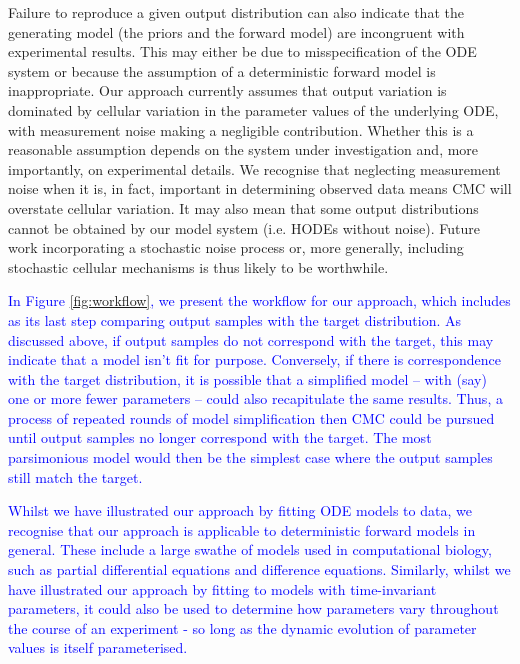 Failure to reproduce a given output distribution can also indicate that the generating model (the priors and the forward model) are incongruent with experimental results. This may either be due to misspecification of the ODE system or because the assumption of a deterministic forward model is inappropriate. Our approach currently assumes that output variation is dominated by cellular variation in the parameter values of the underlying ODE, with measurement noise making a negligible contribution. Whether this is a reasonable assumption depends on the system under investigation and, more importantly, on experimental details. We recognise that neglecting measurement noise when it is, in fact, important in determining observed data means CMC will overstate cellular variation. It may also mean that some output distributions cannot be obtained by our model system (i.e. HODEs without noise). Future work incorporating a stochastic noise process or, more generally, including stochastic cellular mechanisms is thus likely to be worthwhile.

\textcolor{blue}{In Figure \ref{fig:workflow}, we present the workflow for our approach, which includes as its last step comparing output samples with the target distribution. As discussed above, if output samples do not correspond with the target, this may indicate that a model isn't fit for purpose. Conversely, if there is correspondence with the target distribution, it is possible that a simplified model -- with (say) one or more fewer parameters -- could also recapitulate the same results. Thus, a process of repeated rounds of model simplification then CMC could be pursued until output samples no longer correspond with the target. The most parsimonious model would then be the simplest case where the output samples still match the target.}

\textcolor{blue}{Whilst we have illustrated our approach by fitting ODE models to data, we recognise that our approach is applicable to deterministic forward models in general. These include a large swathe of models used in computational biology, such as partial differential equations and difference equations. Similarly, whilst we have illustrated our approach by fitting to models with time-invariant parameters, it could also be used to determine how parameters vary throughout the course of an experiment - so long as the dynamic evolution of parameter values is itself parameterised.}

